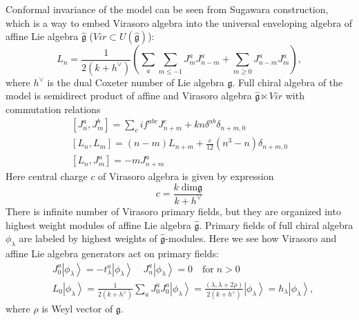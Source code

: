 \documentclass[a4paper]{jpconf}
\theoremstyle{definition}
\newcommand{\gf}{\mathfrak{g}}
\newcommand{\gfh}{\hat{\mathfrak{g}}}
\theoremstyle{definition} \newtheorem{Def}{Definition}
\begin{document}
Conformal invariance of the model can  be seen from 
Sugawara construction, which is a way to embed Virasoro algebra into the universal enveloping algebra of affine Lie algebra $\gfh$ ($Vir\subset U(\gfh)$):
\begin{equation}
  \label{eq:4}
  L_n=\frac{1}{2(k+h^{\vee})}\left(\sum\limits_a\sum\limits_{m\leq -1}J^a_m J^a_{n-m}+\sum_{m\geq 0} J^{a}_{n-m}J^{a}_{m}\right), 
\end{equation}
 where $h^{\vee}$ is the dual Coxeter number of Lie algebra $\gf$. 
Full chiral algebra of the model is semidirect product of affine and Virasoro algebra $\gfh \ltimes Vir$ with commutation relations 
  \begin{equation}
    \label{eq:92}
    \begin{aligned}
      \left[J^a_n,J^b_m\right]=\sum_c i f^{abc}J^c_{n+m}+kn\delta^{ab}\delta_{n+m,0} \\
      \left[L_n,L_m\right]=(n-m)L_{n+m}+\frac{c}{12}(n^3-n)\delta_{n+m,0}\\
      \left[L_n,J^a_m\right]=-mJ^a_{n+m}
    \end{aligned}
  \end{equation}
Here central charge $c$ of Virasoro algebra is given by expression
\begin{equation}
  \label{eq:25}
  c=\frac{k\;\mathrm{dim}\gf}{k+h^{\vee}}
\end{equation}
There is infinite number of Virasoro primary fields, but they are organized into highest weight modules of affine Lie algebra $\gfh$. 
Primary fields of full chiral algebra $\phi_{\lambda}$ are labeled by highest weights of  $\gfh$-modules. Here we see how Virasoro and affine Lie algebra generators act on primary fields:
  \begin{equation*}
    \begin{aligned}
      & J_0^a\left|\phi_{\lambda}\right>=-t^a_{\lambda}\left|\phi_{\lambda}\right>  \quad    J^a_n\left|\phi_{\lambda}\right>=0 \quad \mbox{for}\; n>0 \\
      & L_0\left|\phi_{\lambda}\right>=\frac{1}{2(k+h^{\vee})}\sum_aJ^a_0J^a_0\left|\phi_{\lambda}\right>=\frac{(\lambda,\lambda+2\rho)}{2(k+h^{\vee})}\left|\phi_{\lambda}\right>=h_{\lambda} \left|\phi_{\lambda}\right>,
    \end{aligned}
  \end{equation*}
where $\rho$ is Weyl vector of $\gf$. 
\end{document}
